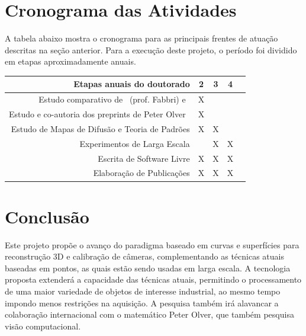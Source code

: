 \documentclass[a4paper,titlepage]{article}
\begin{document}

\section{Cronograma das Atividades}
A tabela abaixo mostra o cronograma para as principais frentes de atuação descritas na
seção anterior. Para a execução deste projeto, o período foi dividido em etapas aproximadamente
anuais.
\begin{center}
\begin{tabular} {||r|c|c|c|c||}
\hline
\textbf{Etapas anuais do doutorado} & 2 & 3 & 4 \\
\hline
Estudo comparativo de~\cite{Fabbri:Kimia:IJCV2016} (prof. Fabbri)
e~\cite{Kogan:Olver:LobachevskiiJMA2015} & X &    & \\
\hline
Estudo e co-autoria dos preprints de Peter Olver~\cite{Olver:Reprojn:Preprint:2020,Olver:Outline:Preprint:2020} & X &    & \\
\hline
Estudo de Mapas de Difusão e Teoria de Padrões &  X & X &  \\
\hline
Experimentos de Larga Escala &     & X & X\\
\hline
Escrita de Software Livre &   X & X & X\\
\hline
Elaboração de Publicações &   X & X & X\\
\hline
\end{tabular}
\end{center}

\section{Conclusão}
Este projeto propõe o avanço do 
paradigma baseado em curvas e superfícies para reconstrução 3D e calibração de
câmeras, complementando as técnicas atuais baseadas em pontos, as quais estão
sendo usadas em larga escala. A tecnologia proposta extenderá a capacidade das
técnicas atuais, permitindo o processamento de uma maior variedade de objetos de
interesse industrial, ao mesmo tempo impondo menos restrições na aquisição. 
A pesquisa também irá alavancar a colaboração internacional com o matemático
Peter Olver, que também pesquisa visão computacional.
\end{document}
